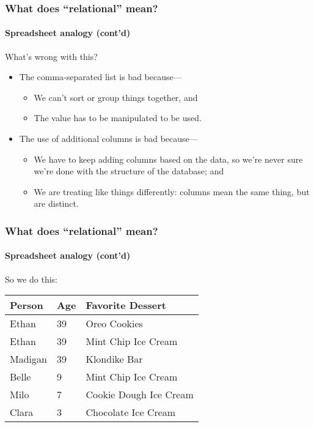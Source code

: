 \documentclass{beamer}
\begin{document}
\begin{frame}
  \frametitle{What does ``relational'' mean?}
  \framesubtitle{Spreadsheet analogy (cont'd)}

  What's wrong with this?
  \begin{itemize}
    \item The comma-separated list is bad because---
          \begin{itemize}
            \item We can't sort or group things together, and
            \item The value has to be manipulated to be used.
          \end{itemize}
    \item The use of additional columns is bad because---
          \begin{itemize}
            \item We have to keep adding columns based on the data, so we're
                  never sure we're done with the structure of the database; and
            \item We are treating like things differently: columns mean the same
                  thing, but are distinct.
          \end{itemize}
  \end{itemize}
\end{frame}

\begin{frame}
  \frametitle{What does ``relational'' mean?}
  \framesubtitle{Spreadsheet analogy (cont'd)}

  So we do this:

  \begin{table}[]
    \small
    \begin{tabular}{@{}lll@{}}
      \toprule
      Person  & Age & Favorite Dessert       \\ \midrule
      Ethan   & 39  & Oreo Cookies           \\
      Ethan   & 39  & Mint Chip Ice Cream    \\
      Madigan & 39  & Klondike Bar           \\
      Belle   & 9   & Mint Chip Ice Cream    \\
      Milo    & 7   & Cookie Dough Ice Cream \\
      Clara   & 3   & Chocolate Ice Cream    \\ \bottomrule
    \end{tabular}
  \end{table}
\end{frame}
\end{document}
